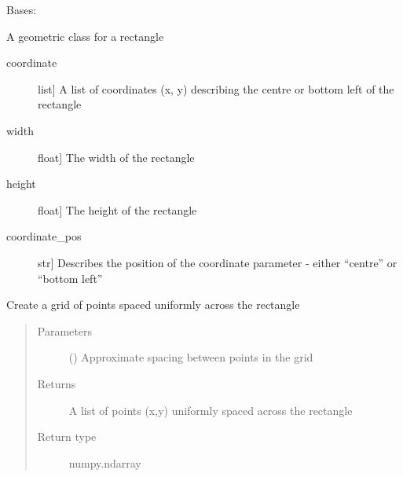 \documentclass[letterpaper,10pt,english]{sphinxmanual}
\begin{document}
\begin{fulllineitems}
\label{\detokenize{source/pyzones:pyzones.Rectangle}}
Bases: {\hyperref[\detokenize{source/pyzones:pyzones.Shape}]{}}

A geometric class for a rectangle
\begin{description}
\item[{coordinate}] \leavevmode{[}list{]}
A list of coordinates (x, y) describing the centre or bottom left of the rectangle

\item[{width}] \leavevmode{[}float{]}
The width of the rectangle

\item[{height}] \leavevmode{[}float{]}
The height of the rectangle

\item[{coordinate\_pos}] \leavevmode{[}str{]}
Describes the position of the coordinate parameter - either “centre” or “bottom left”

\end{description}

\begin{fulllineitems}
\label{\detokenize{source/pyzones:pyzones.Rectangle.get_grid}}
Create a grid of points spaced uniformly across the rectangle
\begin{quote}\begin{description}
\item[{Parameters}] \leavevmode
{} () \textendash{} Approximate spacing between points in the grid

\item[{Returns}] \leavevmode
A list of points (x,y) uniformly spaced across the rectangle

\item[{Return type}] \leavevmode
numpy.ndarray

\end{description}\end{quote}


\end{fulllineitems}
\end{fulllineitems}
\end{document}
